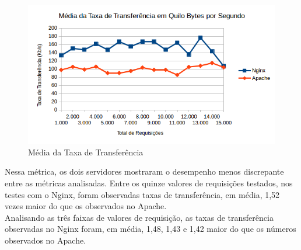 \begin{figure}[H]
	\centering
	\includegraphics[width=1\linewidth]{graficos/grafico6} 
	\caption{Média da Taxa de Transferência}
	\label{fig:grafico6}
\end{figure}
Nessa métrica, os dois servidores mostraram o desempenho menos discrepante 
entre as métricas analisadas. Entre os quinze valores de requisições testados, 
nos testes com o Nginx, foram observadas taxas de transferência, em média, 1,52 
vezes maior do que os observados no Apache.\\
Analisando as três faixas de valores de requisição, as taxas de transferência 
observadas no Nginx foram, em média, 1,48, 1,43 e 1,42 maior do que os números 
observados no Apache.
